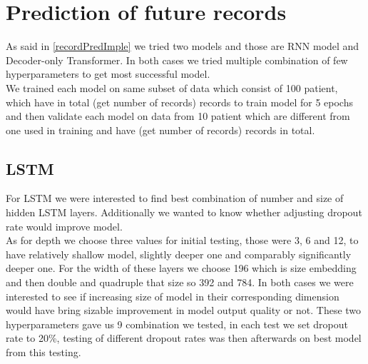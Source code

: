 
\section{Prediction of future records}
\label{recordPredRes}

As said in \ref{recordPredImple} we tried two models and those are RNN model and Decoder-only Transformer. In both cases we tried multiple combination of few hyperparameters to get most successful model. 
\\

We trained each model on same subset of data which consist of 100 patient, which have in total (get number of records) records to train model for 5 epochs and then validate each model on data from 10 patient which are different from one used in training and have (get number of records) records in total.  

\subsection{LSTM}

For LSTM we were interested to find best combination of number and size of hidden LSTM layers. Additionally we wanted to know whether adjusting dropout rate would improve model.
\\

As for depth we choose three values for initial testing, those were 3, 6 and 12, to have relatively shallow model, slightly deeper one and comparably significantly deeper one. For the width of these layers we choose 196 which is size embedding and then double and quadruple that size so 392 and 784. In both cases we were interested to see if increasing size of model in their corresponding dimension would have bring sizable improvement in model output quality or not. These two hyperparameters gave us 9 combination we tested, in each test we set dropout rate to 20\%, testing of different dropout rates was then afterwards on best model from this testing. 
\\

